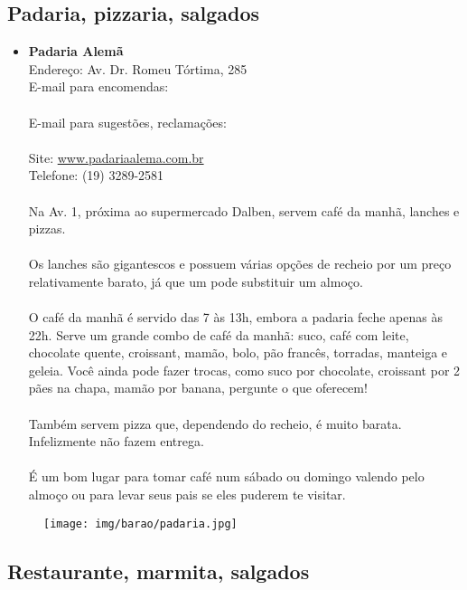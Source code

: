 \subsection{Padaria, pizzaria, salgados}

\begin{itemize}
\item \textbf{Padaria Alemã}
  \\Endereço: Av. Dr. Romeu Tórtima, 285
  \\E-mail para encomendas:\\
  \\E-mail para sugestões, reclamações:\\
  \\Site: \url{www.padariaalema.com.br}
  \\Telefone: (19) 3289-2581
  \\
  \\Na Av. 1, próxima ao supermercado Dalben, servem café da manhã, lanches e
  pizzas.
  \\
  \\Os lanches são gigantescos e possuem várias opções de recheio por um preço
  relativamente barato, já que um pode substituir um almoço.
  \\
  \\O café da manhã é servido das 7 às 13h, embora a padaria feche apenas às
  22h. Serve um grande combo de café da manhã: suco, café com leite, chocolate
  quente, croissant, mamão, bolo, pão francês, torradas, manteiga e geleia.
  Você ainda pode fazer trocas, como suco por chocolate, croissant por 2 pães
  na chapa, mamão por banana, pergunte o que oferecem!
  \\
  \\Também servem pizza que, dependendo do recheio, é muito barata.
  Infelizmente não fazem entrega.
  \\
  \\É um bom lugar para tomar café num sábado ou domingo valendo pelo almoço ou
  para levar seus pais se eles puderem te visitar.
\end{itemize}

\begin{figure}[h!]
    \centering
    \texttt{[image: img/barao/padaria.jpg]}
\end{figure}

\subsection{Restaurante, marmita, salgados}

